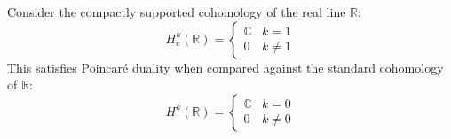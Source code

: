 \begin{example}
    Consider the compactly supported cohomology of the real line $\mathbb{R}$:
\begin{equation*}
    H_c^k(\mathbb{R}) = 
    \begin{cases} 
        \mathbb{C} & k = 1 \\ 
        0 & k \neq 1 
    \end{cases}
\end{equation*}
This satisfies Poincaré duality when compared against the standard cohomology of $\mathbb{R}$:
\begin{equation*}
    H^k(\mathbb{R}) = 
    \begin{cases} 
        \mathbb{C} & k = 0 \\ 
        0 & k \neq 0 
    \end{cases}
\end{equation*}
\end{example}

